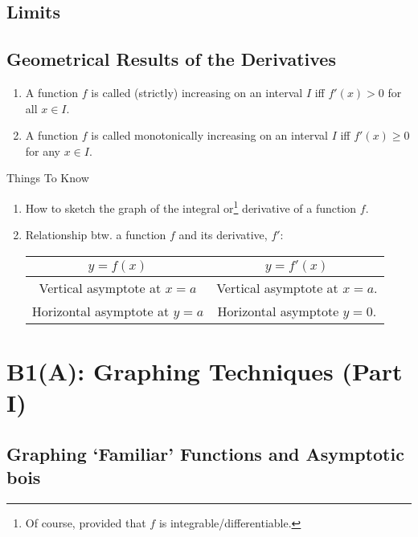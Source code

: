 \documentclass[oneside]{book}
\begin{document}
\section{Limits}
\section{Geometrical Results of the Derivatives}
\begin{definition*}{}{}
  \begin{enumerate}[label=(\roman*)]
    \item A function \(f\) is called (strictly) increasing on an interval \(I\) iff \(f'(x)>0\) for all \(x \in I\).
    \item A function \(f\) is called monotonically increasing on an interval \(I\) iff \(f'(x) \geq 0\) for any \(x \in I\).
  \end{enumerate}
\end{definition*}
\begin{stbox}{Things To Know}
  \begin{enumerate}
    \item How to sketch the graph of the integral or\footnote{Of course, provided that \(f\) is integrable/differentiable.} derivative of a function \(f\).
    \item Relationship btw. a function \(f\) and its derivative, \(f'\):\\[4mm]
    \begin{tabular}{|c|c|}
      \hline
      \(y=f(x)\) & \(y=f'(x)\)\\
      \hline
      Vertical asymptote at \(x=a\) & Vertical asymptote at \(x=a\).\\
      \hline
      Horizontal asymptote at \(y=a\) & Horizontal asymptote \(y=0\).\\
      \hline
    \end{tabular}
  \end{enumerate}
\end{stbox}

\chapter{B1(A): Graphing Techniques (Part I)}
\section{Graphing `Familiar' Functions and Asymptotic bois}
\end{document}
